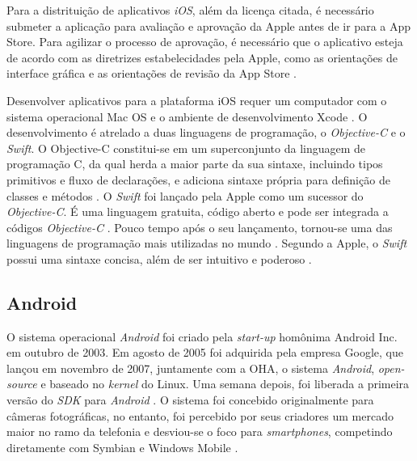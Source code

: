 Para a distrituição de aplicativos \textit{iOS}, além da licença citada, é necessário submeter a aplicação para avaliação e aprovação da Apple antes de ir para a App Store. Para agilizar o processo de aprovação, é necessário que o aplicativo esteja de acordo com as diretrizes estabelecidades pela Apple, como as orientações de interface gráfica e as orientações de revisão da App Store \cite{apple_inc_submitting_2016}.

Desenvolver aplicativos para a plataforma iOS requer um computador com o sistema operacional Mac OS e o ambiente de desenvolvimento Xcode \cite{heitkotter_evaluating_2013}. 
O desenvolvimento é atrelado a duas linguagens de programação, o \textit{Objective-C} e o \textit{Swift}.
O Objective-C constitui-se em um superconjunto da linguagem de programação C, da qual herda a maior parte da sua sintaxe, incluindo tipos primitivos e fluxo de declarações, e adiciona sintaxe própria para definição de classes e métodos \cite{apple_inc_about_2014}. 
O \textit{Swift} foi lançado pela Apple como um sucessor do \textit{Objective-C}. É uma linguagem gratuita, código aberto e pode ser integrada a códigos \textit{Objective-C} \cite{apple_inc_swift_2016}. Pouco tempo após o seu lançamento, tornou-se uma das linguagens de programação mais utilizadas no mundo \cite{rebouas_empirical_2016}. Segundo a Apple, o \textit{Swift} possui uma sintaxe concisa, além de ser intuitivo e poderoso \cite{apple_inc_swift_2016}.

\subsection{Android} \label{subsection:android}

O sistema operacional \textit{Android} foi criado pela \textit{start-up} homônima Android Inc. em outubro de 2003. Em agosto de 2005 foi adquirida pela empresa Google, que lançou
em novembro de 2007, juntamente com a OHA, o sistema \textit{Android}, \textit{open-source} e baseado no \textit{kernel} do Linux. Uma semana depois, foi liberada a primeira versão do \textit{SDK} para \textit{Android} \cite{vavru_android_2014}.
O sistema foi concebido originalmente para câmeras fotográficas, no entanto, foi percebido por seus criadores um mercado maior no ramo da telefonia e desviou-se o 
foco para \textit{smartphones}, competindo diretamente com Symbian e Windows Mobile \cite{papajorgji_automated_2015}.

